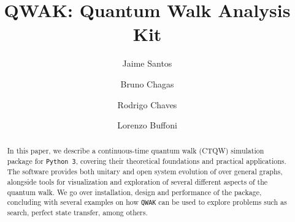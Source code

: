 \documentclass[preprint,12pt]{elsarticle}
\begin{document}
\begin{frontmatter}



\title{QWAK: Quantum Walk Analysis Kit}


\author[a]{Jaime Santos}
\author[b]{Bruno Chagas}
\author[c]{Rodrigo Chaves}
\author[d]{Lorenzo Buffoni}

\address[a]{Haslab, INESC TEC, Portugal}
\address[b]{National University of Ireland Galway, Ireland}
\address[c]{Universidade Federal de Minas Gerais, Brazil}
\address[d]{Department of Physics and Astronomy, University of Florence, 50019 Sesto Fiorentino, Italy}

\begin{abstract}
In this paper, we describe a continuous-time quantum walk (CTQW) simulation
package for \texttt{Python 3}, covering their theoretical foundations and
practical applications. The software provides both unitary and open system
evolution of over general graphs, alongside tools for visualization and
exploration of several different aspects of the quantum walk.  We go over
installation, design and performance of the package, concluding with several
examples on how \texttt{QWAK} can be used to explore problems such as search,
perfect state transfer, among others.
\end{abstract}




\end{frontmatter}
\end{document}
